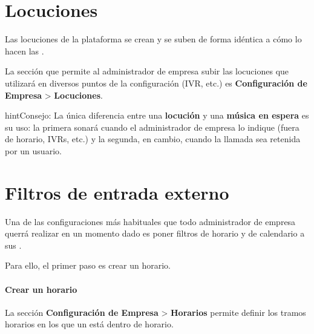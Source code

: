 \documentclass[letterpaper,10pt,spanish]{sphinxmanual}
\begin{document}
\noindent{}


\section{Locuciones}
\label{pbx_features/sounds::doc}\label{pbx_features/sounds:locuciones}
Las locuciones de la plataforma se crean y se suben de forma idéntica a cómo lo hacen las {\hyperref[pbx_features/music_on_hold:musiconhold]{}}.

La sección que permite al administrador de empresa subir las locuciones que utilizará en diversos puntos de la configuración (IVR, etc.) es \textbf{Configuración de Empresa} \textgreater{} \textbf{Locuciones}.

\noindent{}

\begin{notice}{hint}{Consejo:}
La única diferencia entre una \textbf{locución} y una \textbf{música en espera} es su uso: la primera sonará cuando el administrador de empresa lo indique (fuera de horario, IVRs, etc.) y la segunda, en cambio, cuando la llamada sea retenida por un usuario.
\end{notice}


\section{Filtros de entrada externo}
\label{pbx_features/external_filters:filtros-de-entrada-externo}\label{pbx_features/external_filters:external-filters}\label{pbx_features/external_filters::doc}
Una de las configuraciones más habituales que todo administrador de empresa querrá realizar en un momento dado es poner filtros de horario y de calendario a sus {\hyperref[pbx_features/external_ddis:external\string-ddis]{}}.

Para ello, el primer paso es crear un horario.
\paragraph{Crear un horario}

La sección \textbf{Configuración de Empresa} \textgreater{} \textbf{Horarios} permite definir los tramos horarios en los que un {\hyperref[pbx_features/external_ddis:external\string-ddis]{}} está dentro de horario.
\end{document}
